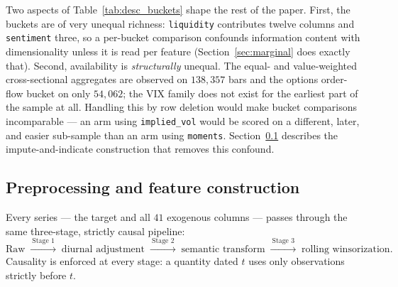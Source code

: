 Two aspects of Table~\ref{tab:desc_buckets} shape the rest of the paper. First,
the buckets are of very unequal richness: \texttt{liquidity} contributes twelve
columns and \texttt{sentiment} three, so a per-bucket comparison confounds
information content with dimensionality unless it is read per feature
(Section~\ref{sec:marginal} does exactly that). Second, availability is
\emph{structurally} unequal. The equal- and value-weighted cross-sectional
aggregates are observed on $138{,}357$ bars and the options order-flow bucket on
only $54{,}062$; the VIX family does not exist for the earliest part of the
sample at all. Handling this by row deletion would make bucket comparisons
incomparable --- an arm using \texttt{implied\_vol} would be scored on a
different, later, and easier sub-sample than an arm using
\texttt{moments}. Section~\ref{sec:desc_preprocessing} describes the
impute-and-indicate construction that removes this confound.


\subsection{Preprocessing and feature construction}
\label{sec:desc_preprocessing}

Every series --- the target and all $41$ exogenous columns --- passes through the
same three-stage, strictly causal pipeline:
\begin{equation}
    \text{Raw} \;\xrightarrow{\ \text{Stage 1}\ }\; \text{diurnal adjustment}
    \;\xrightarrow{\ \text{Stage 2}\ }\; \text{semantic transform}
    \;\xrightarrow{\ \text{Stage 3}\ }\; \text{rolling winsorization}.
    \label{eq:desc_pipeline}
\end{equation}
Causality is enforced at every stage: a quantity dated $t$ uses only
observations strictly before $t$.

